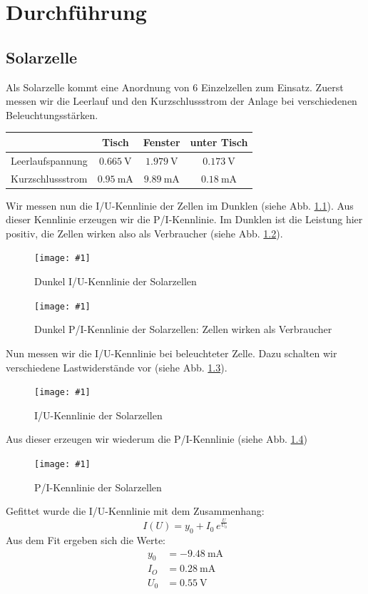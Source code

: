 ﻿\newcommand{\mess}[3] {
\begin{figure}[htbp]
	\centering
	\texttt{[image: \#1]}
	\caption{#2}
	\label{#3}
\end{figure} }
\newcommand{\refabb}[1]{(siehe Abb. \ref{#1})}
\chapter{Durchführung}

\section{Solarzelle}
Als Solarzelle kommt eine Anordnung von 6 Einzelzellen zum Einsatz. Zuerst messen wir die Leerlauf und den Kurzschlussstrom der Anlage bei verschiedenen Beleuchtungsstärken.
\begin{center}
\begin{tabular}{ |  l  c  c  c | }
\hline
	& Tisch	& Fenster & unter Tisch \\ \hline	
Leerlaufspannung & $\SI{0,665}{\volt}$	& $\SI{1,979}{\volt}$	& $\SI{0,173}{\volt}$ \\ 
Kurzschlussstrom & $\SI{0,95}{\milli \ampere}$	& $\SI{9,89}{\milli \ampere}$	& $\SI{0,18}{\milli \ampere}$ \\ 
\hline
\end{tabular}
\end{center}

Wir messen nun die I/U-Kennlinie der Zellen im Dunklen \refabb{a2}.
Aus dieser Kennlinie erzeugen wir die P/I-Kennlinie. Im Dunklen ist die Leistung hier positiv, die Zellen wirken also als Verbraucher \refabb{a2pi}. 
\mess{mess/aufg2.pdf}{Dunkel I/U-Kennlinie der Solarzellen}{a2}
\mess{mess/aufg2_pi.pdf}{Dunkel P/I-Kennlinie der Solarzellen: Zellen wirken als Verbraucher}{a2pi}

Nun messen wir die I/U-Kennlinie bei beleuchteter Zelle. Dazu schalten wir verschiedene Lastwiderstände vor \refabb{a3}. 
\mess{mess/aufg3_iu.pdf}{I/U-Kennlinie der Solarzellen}{a3}
Aus dieser erzeugen wir wiederum die P/I-Kennlinie \refabb{a3pi}
\mess{mess/aufg3_pi.pdf}{P/I-Kennlinie der Solarzellen}{a3pi} 
Gefittet wurde die I/U-Kennlinie mit dem Zusammenhang:
\[
I(U) = y_0 + I_0 \, e^{\frac{U}{U_0}}
\]
Aus dem Fit ergeben sich die Werte:
\begin{align*}
	y_0 &= \SI{-9.48}{\milli \ampere}\\
	I_O &= \SI{0.28}{\milli \ampere}\\
	U_0 &= \SI{0.55}{\volt}
\end{align*}

